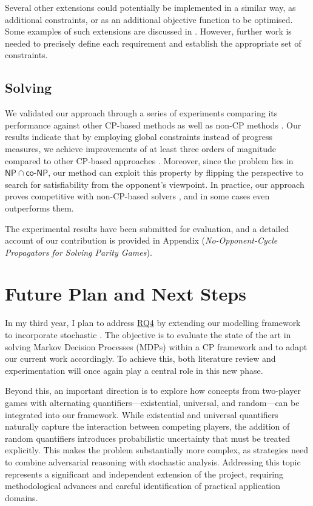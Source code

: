 \documentclass{article}
\begin{document}
Several other extensions could potentially be implemented in a similar way, as additional constraints, or as an additional objective function to be optimised. Some examples of such extensions are discussed in \cite{bozzelly:2020, Fijalkow:2014, Mogavero:2015, Weinert:2016}. However, further work is needed to precisely define each requirement and establish the appropriate set of constraints.

\subsection{Solving}

We validated our approach through a series of experiments comparing its performance against other CP-based methods \cite{Heljanko:2012} as well as non-CP methods \cite{Zielonka:1998}. Our results indicate that by employing global constraints instead of progress measures, we achieve improvements of at least three orders of magnitude compared to other CP-based approaches \cite{Heljanko:2012}. Moreover, since the problem lies in $\mathsf{NP} \cap \mathsf{co\textit{-}NP}$, our method can exploit this property by flipping the perspective to search for satisfiability from the opponent’s viewpoint. In practice, our approach proves competitive with non-CP-based solvers \cite{Zielonka:1998}, and in some cases even outperforms them.

The experimental results have been submitted for evaluation, and a detailed account of our contribution is provided in Appendix (\emph{No-Opponent-Cycle Propagators for Solving Parity Games}).

\section{Future Plan and Next Steps}

In my third year, I plan to address \hyperref[sec:rq]{RQ4} by extending our modelling framework to incorporate stochastic \wregulargames. The objective is to evaluate the state of the art in solving Markov Decision Processes (MDPs) within a CP framework and to adapt our current work accordingly. To achieve this, both literature review and experimentation will once again play a central role in this new phase.

Beyond this, an important direction is to explore how concepts from two-player games with alternating quantifiers—existential, universal, and random—can be integrated into our framework. While existential and universal quantifiers naturally capture the interaction between competing players, the addition of random quantifiers introduces probabilistic uncertainty that must be treated explicitly. This makes the problem substantially more complex, as strategies need to combine adversarial reasoning with stochastic analysis. Addressing this topic represents a significant and independent extension of the project, requiring methodological advances and careful identification of practical application domains.
\end{document}
